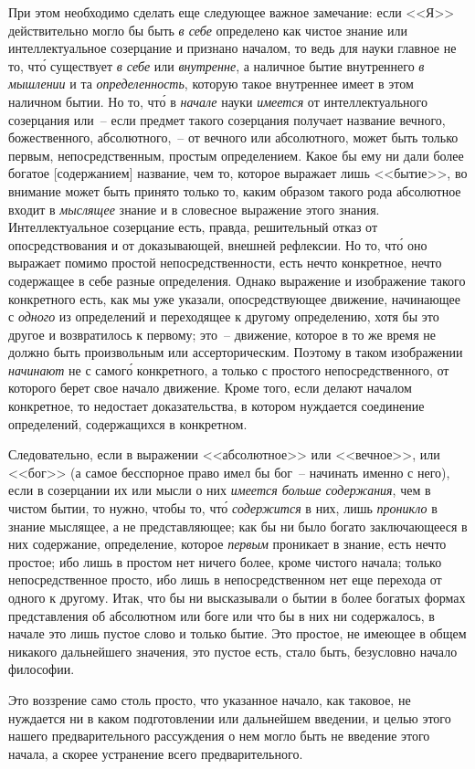 При этом необходимо сделать еще следующее важное
замечание: если <<Я>> действительно могло бы быть \emph{в себе}
определено как чистое знание или интеллектуальное
созерцание и признано началом, то ведь для науки главное
не то, чт\'о существует \emph{в себе} или \emph{внутренне}, а наличное
бытие внутреннего \emph{в мышлении} и та \emph{определенность},
которую такое внутреннее имеет в этом наличном бытии.
Но то, чт\'о в \emph{начале} науки \emph{имеется} от интеллектуального
созерцания или~-- если предмет такого созерцания получает
название вечного, божественного, абсолютного,~-- от
вечного или абсолютного, может быть только первым, непосредственным,
простым определением. Какое бы ему
ни дали более богатое [содержанием] название, чем то,
которое выражает лишь <<бытие>>, во внимание может
быть принято только то, каким образом такого рода абсолютное
входит в \emph{мыслящее} знание и в словесное выражение
этого знания. Интеллектуальное созерцание есть,
правда, решительный отказ от опосредствования и от доказывающей,
внешней рефлексии. Но то, чт\'о оно выражает
помимо простой непосредственности, есть нечто
конкретное, нечто содержащее в себе разные определения.
Однако выражение и изображение такого конкретного
есть, как мы уже указали, опосредствующее движение,
начинающее с \emph{одного} из определений и переходящее
к другому определению, хотя бы это другое и возвратилось
к первому; это~-- движение, которое в то же время
не должно быть произвольным или ассерторическим.
Поэтому в таком изображении \emph{начинают} не с самог\'о
конкретного, а только с простого непосредственного, от
которого берет свое начало движение. Кроме того, если
делают началом конкретное, то недостает доказательства,
в котором нуждается соединение определений, содержащихся
в конкретном.

Следовательно, если в выражении <<абсолютное>> или
<<вечное>>, или <<бог>> (а самое бесспорное право имел бы
бог~-- начинать именно с него), если в созерцании их или
мысли о них \emph{имеется больше содержания}, чем в чистом
бытии, то нужно, чтобы то, чт\'о \emph{содержится} в них, лишь
\emph{проникло} в знание мыслящее, а не представляющее; как
бы ни было богато заключающееся в них содержание,
определение, которое \emph{первым} проникает в знание, есть
нечто простое; ибо лишь в простом нет ничего более,
кроме чистого начала; только непосредственное просто,
ибо лишь в непосредственном нет еще перехода от одного
к другому. Итак, что бы ни высказывали о бытии в более
богатых формах представления об абсолютном или боге
или что бы в них ни содержалось, в начале это лишь
пустое слово и только бытие. Это простое, не имеющее
в общем никакого дальнейшего значения, это пустое
есть, стало быть, безусловно начало философии.

Это воззрение само столь просто, что указанное начало,
как таковое, не нуждается ни в каком подготовлении
или дальнейшем введении, и целью этого нашего
предварительного рассуждения о нем могло быть не введение
этого начала, а скорее устранение всего предварительного.


